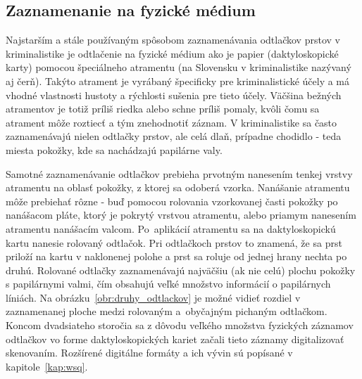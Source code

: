   \subsection{Zaznamenanie na fyzické médium}
  Najstarším a stále používaným spôsobom zaznamenávania odtlačkov prstov v kriminalistike je odtlačenie na fyzické médium ako je papier (daktyloskopické karty)
  pomocou špeciálneho atramentu (na Slovensku v kriminalistike nazývaný aj čerň). Takýto atrament je vyrábaný špecificky pre kriminalistické účely a má vhodné
  vlastnosti hustoty a rýchlosti sušenia pre tieto
  účely. Väčšina bežných atramentov je totiž príliš riedka alebo schne príliš pomaly, kvôli čomu sa atrament môže roztiecť a tým znehodnotiť záznam.
  V kriminalistike sa často zaznamenávajú nielen odtlačky prstov, ale celá dlaň, prípadne chodidlo - teda miesta pokožky, kde sa nachádzajú papilárne valy.

  Samotné zaznamenávanie odtlačkov prebieha prvotným nanesením tenkej vrstvy atramentu na oblasť pokožky, z ktorej sa odoberá vzorka. Nanášanie atramentu môže
  prebiehať rôzne - buď pomocou rolovania vzorkovanej časti pokožky po nanášacom pláte, ktorý je pokrytý vrstvou atramentu, alebo priamym nanesením atramentu
  nanášacím valcom. Po~aplikácií atramentu sa na daktyloskopickú kartu nanesie rolovaný odtlačok. Pri odtlačkoch prstov to znamená, že sa prst priloží
  na kartu v naklonenej polohe a prst sa roluje od jednej hrany nechta po druhú. Rolované odtlačky zaznamenávajú najväčšiu (ak nie celú) plochu pokožky
  s papilárnymi valmi, čím obsahujú veľké množstvo informácií o papilárnych líniách. Na obrázku~{\ref{obr:druhy_odtlackov}} je možné vidieť rozdiel v zaznamenanej
  ploche medzi rolovaným a~obyčajným pichaným odtlačkom. Koncom dvadsiateho storočia sa z dôvodu veľkého množstva fyzických záznamov odtlačkov vo forme
  daktyloskopických kariet začali tieto záznamy digitalizovať skenovaním. Rozšírené digitálne formáty a ich vývin sú popísané v kapitole~{\ref{kap:wsq}}.

